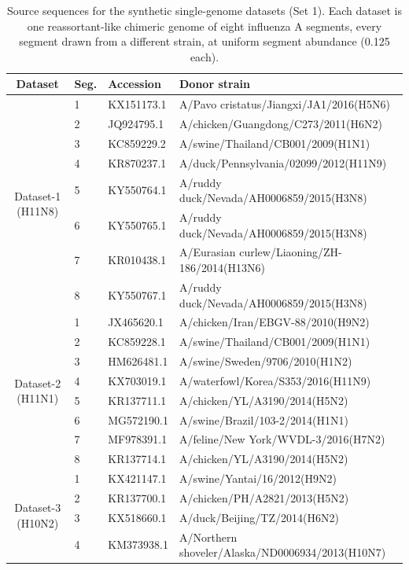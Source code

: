 \begin{table}[t]
\caption{Source sequences for the synthetic single-genome datasets (Set 1). Each dataset is one reassortant-like chimeric genome of eight influenza A segments, every segment drawn from a different strain, at uniform segment abundance (0.125 each).\label{tab:syn-isolate-sources}}
\centering
\footnotesize
\begin{tabular}{clll}
\toprule
\textbf{Dataset} & \textbf{Seg.} & \textbf{Accession} & \textbf{Donor strain} \\
\midrule
\multirow{8}{*}{Dataset-1 (H11N8)} & 1 & KX151173.1 & A/Pavo cristatus/Jiangxi/JA1/2016(H5N6) \\
 & 2 & JQ924795.1 & A/chicken/Guangdong/C273/2011(H6N2) \\
 & 3 & KC859229.2 & A/swine/Thailand/CB001/2009(H1N1) \\
 & 4 & KR870237.1 & A/duck/Pennsylvania/02099/2012(H11N9) \\
 & 5 & KY550764.1 & A/ruddy duck/Nevada/AH0006859/2015(H3N8) \\
 & 6 & KY550765.1 & A/ruddy duck/Nevada/AH0006859/2015(H3N8) \\
 & 7 & KR010438.1 & A/Eurasian curlew/Liaoning/ZH-186/2014(H13N6) \\
 & 8 & KY550767.1 & A/ruddy duck/Nevada/AH0006859/2015(H3N8) \\
\midrule
\multirow{8}{*}{Dataset-2 (H11N1)} & 1 & JX465620.1 & A/chicken/Iran/EBGV-88/2010(H9N2) \\
 & 2 & KC859228.1 & A/swine/Thailand/CB001/2009(H1N1) \\
 & 3 & HM626481.1 & A/swine/Sweden/9706/2010(H1N2) \\
 & 4 & KX703019.1 & A/waterfowl/Korea/S353/2016(H11N9) \\
 & 5 & KR137711.1 & A/chicken/YL/A3190/2014(H5N2) \\
 & 6 & MG572190.1 & A/swine/Brazil/103-2/2014(H1N1) \\
 & 7 & MF978391.1 & A/feline/New York/WVDL-3/2016(H7N2) \\
 & 8 & KR137714.1 & A/chicken/YL/A3190/2014(H5N2) \\
\midrule
\multirow{8}{*}{Dataset-3 (H10N2)} & 1 & KX421147.1 & A/swine/Yantai/16/2012(H9N2) \\
 & 2 & KR137700.1 & A/chicken/PH/A2821/2013(H5N2) \\
 & 3 & KX518660.1 & A/duck/Beijing/TZ/2014(H6N2) \\
 & 4 & KM373938.1 & A/Northern shoveler/Alaska/ND0006934/2013(H10N7) \\

\end{tabular}
\end{table}
